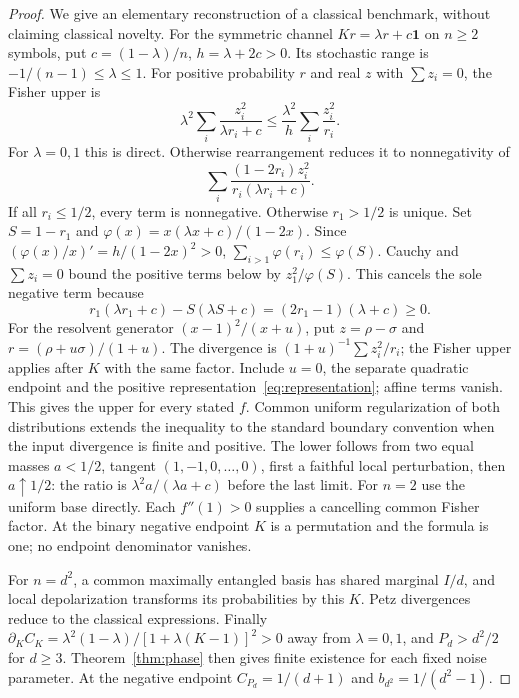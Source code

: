 \begin{proof}
We give an elementary reconstruction of a classical benchmark, without claiming classical novelty. For the symmetric channel $Kr=\lambda r+c\mathbf1$ on $n\ge2$ symbols, put $c=(1-\lambda)/n$, $h=\lambda+2c>0$. Its stochastic range is $-1/(n-1)\le\lambda\le1$. For positive probability $r$ and real $z$ with $\sum z_i=0$, the Fisher upper is
\[
 \lambda^2\sum_i\frac{z_i^2}{\lambda r_i+c}
 \le\frac{\lambda^2}{h}\sum_i\frac{z_i^2}{r_i}.
\]
For $\lambda=0,1$ this is direct. Otherwise rearrangement reduces it to nonnegativity of
\[
 \sum_i\frac{(1-2r_i)z_i^2}{r_i(\lambda r_i+c)}.
\]
If all $r_i\le1/2$, every term is nonnegative. Otherwise $r_1>1/2$ is unique. Set $S=1-r_1$ and $\varphi(x)=x(\lambda x+c)/(1-2x)$. Since $(\varphi(x)/x)'=h/(1-2x)^2>0$, $\sum_{i>1}\varphi(r_i)\le\varphi(S)$. Cauchy and $\sum z_i=0$ bound the positive terms below by $z_1^2/\varphi(S)$. This cancels the sole negative term because
\[
 r_1(\lambda r_1+c)-S(\lambda S+c)
 =(2r_1-1)(\lambda+c)\ge0.
\]
For the resolvent generator $(x-1)^2/(x+u)$, put $z=\rho-\sigma$ and $r=(\rho+u\sigma)/(1+u)$. The divergence is $(1+u)^{-1}\sum z_i^2/r_i$; the Fisher upper applies after $K$ with the same factor. Include $u=0$, the separate quadratic endpoint and the positive representation~\eqref{eq:representation}; affine terms vanish. This gives the upper for every stated $f$. Common uniform regularization of both distributions extends the inequality to the standard boundary convention when the input divergence is finite and positive. The lower follows from two equal masses $a<1/2$, tangent $(1,-1,0,\ldots,0)$, first a faithful local perturbation, then $a\uparrow1/2$: the ratio is $\lambda^2a/(\lambda a+c)$ before the last limit. For $n=2$ use the uniform base directly. Each $f''(1)>0$ supplies a cancelling common Fisher factor. At the binary negative endpoint $K$ is a permutation and the formula is one; no endpoint denominator vanishes.

For $n=d^2$, a common maximally entangled basis has shared marginal $I/d$, and local depolarization transforms its probabilities by this $K$. Petz divergences reduce to the classical expressions. Finally $\partial_K C_K=\lambda^2(1-\lambda)/[1+\lambda(K-1)]^2>0$ away from $\lambda=0,1$, and $P_d>d^2/2$ for $d\ge3$. Theorem~\ref{thm:phase} then gives finite existence for each fixed noise parameter. At the negative endpoint $C_{P_d}=1/(d+1)$ and $b_{d^2}=1/(d^2-1)$.
\end{proof}

